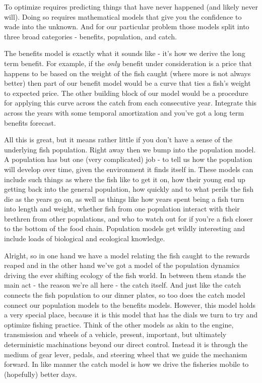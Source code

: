 \documentclass[11pt,a5paper]{book}
\begin{document}
To optimize requires predicting things that have never happened (and likely never will). Doing so requires mathematical models that give you the confidence to wade into the unknown. And for our particular problem those models split into three broad categories - benefits, population, and catch. 
\newline

The benefits model is exactly what it sounds like - it's how we derive the long term benefit. For example, if the \textit{only} benefit under consideration is a price that happens to be based on the weight of the fish caught (where more is not always better) then part of our benefit model would be a curve that ties a fish's weight to expected price. The other building block of our model would be a procedure for applying this curve across the catch from each consecutive year. Integrate this across the years with some temporal amortization and you've got a long term benefits forecast. 
\newline

All this is great, but it means rather little if you don't have a sense of the underlying fish population. Right away then we bump into the population model. A population has but one (very complicated) job - to tell us how the population will develop over time, given the environment it finds itself in. These models can include such things as where the fish like to get it on, how their young end up getting back into the general population, how quickly and to what perils the fish die as the years go on, as well as things like how years spent being a fish turn into length and weight, whether fish from one population interact with their brethren from other populations, and who to watch out for if you're a fish closer to the bottom of the food chain. Population models get wildly interesting and include loads of biological and ecological knowledge. 
\newline

Alright, so in one hand we have a model relating the fish caught to the rewards reaped and in the other hand we've got a model of the population dynamics driving the ever shifting ecology of the fish world. In between them stands the main act - the reason we're all here - the catch itself. And just like the catch connects the fish population to our dinner plates, so too does the catch model connect our population models to the benefits models. However, this model holds a very special place, because it is this model that has the dials we turn to try and optimize fishing practice. Think of the other models as akin to the engine, transmission and wheels of a vehicle, present, important, but ultimately deterministic machinations beyond our direct control. Instead it is through the medium of gear lever, pedals, and steering wheel that we guide the mechanism forward. In like manner the catch model is how we drive the fisheries mobile to (hopefully) better days. 
\newpage
\end{document}

